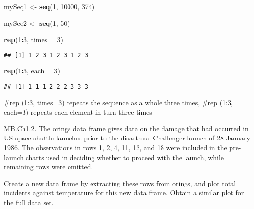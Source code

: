 \documentclass[
]{article}
\newenvironment{Shaded}{\begin{snugshade}}{\end{snugshade}}
\newcommand{\DataTypeTok}[1]{\textcolor[rgb]{0.13,0.29,0.53}{#1}}
\newcommand{\DecValTok}[1]{\textcolor[rgb]{0.00,0.00,0.81}{#1}}
\newcommand{\KeywordTok}[1]{\textcolor[rgb]{0.13,0.29,0.53}{\textbf{#1}}}
\newcommand{\NormalTok}[1]{#1}
\newcommand{\OperatorTok}[1]{\textcolor[rgb]{0.81,0.36,0.00}{\textbf{#1}}}
\newcommand{\StringTok}[1]{\textcolor[rgb]{0.31,0.60,0.02}{#1}}
\begin{document}
\begin{Shaded}
\begin{Highlighting}[]
\NormalTok{mySeq1 <-}\StringTok{ }\KeywordTok{seq}\NormalTok{(}\DecValTok{1}\NormalTok{, }\DecValTok{10000}\NormalTok{, }\DecValTok{374}\NormalTok{)}

\NormalTok{mySeq2 <-}\StringTok{ }\KeywordTok{seq}\NormalTok{(}\DecValTok{1}\NormalTok{, }\DecValTok{50}\NormalTok{)}

\KeywordTok{rep}\NormalTok{(}\DecValTok{1}\OperatorTok{:}\DecValTok{3}\NormalTok{, }\DataTypeTok{times =} \DecValTok{3}\NormalTok{)}
\end{Highlighting}
\end{Shaded}

\begin{verbatim}
## [1] 1 2 3 1 2 3 1 2 3
\end{verbatim}

\begin{Shaded}
\begin{Highlighting}[]
\KeywordTok{rep}\NormalTok{(}\DecValTok{1}\OperatorTok{:}\DecValTok{3}\NormalTok{, }\DataTypeTok{each =} \DecValTok{3}\NormalTok{)}
\end{Highlighting}
\end{Shaded}

\begin{verbatim}
## [1] 1 1 1 2 2 2 3 3 3
\end{verbatim}

\#rep (1:3, times=3) repeats the sequence as a whole three times, \#rep
(1:3, each=3) repeats each element in turn three times

MB.Ch1.2. The orings data frame gives data on the damage that had
occurred in US space shuttle launches prior to the disastrous Challenger
launch of 28 January 1986. The observations in rows 1, 2, 4, 11, 13, and
18 were included in the pre-launch charts used in deciding whether to
proceed with the launch, while remaining rows were omitted.

Create a new data frame by extracting these rows from orings, and plot
total incidents against temperature for this new data frame. Obtain a
similar plot for the full data set.

\begin{Shaded}
\end{Shaded}
\end{document}
